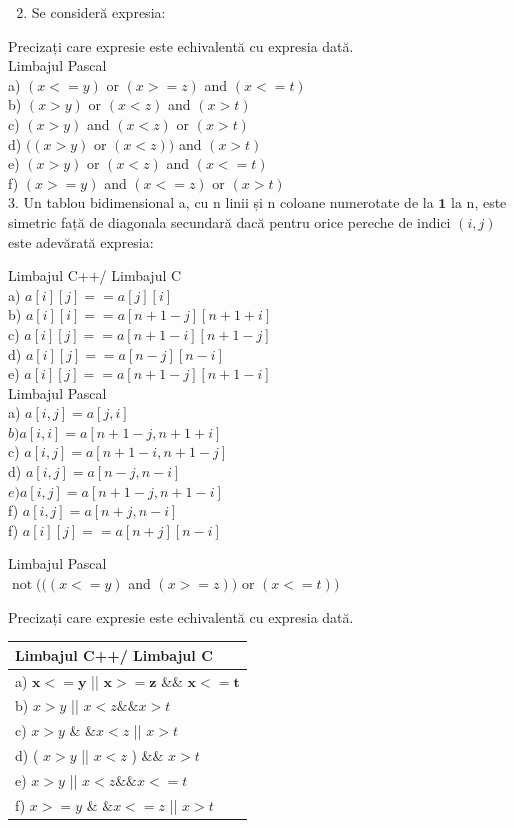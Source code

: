 \documentclass[10pt]{article}
\begin{document}
\begin{enumerate}
  \setcounter{enumi}{1}
  \item Se consideră expresia:
\end{enumerate}

Precizați care expresie este echivalentă cu expresia dată.\\
Limbajul Pascal\\
a) $(x<=y)$ or $(x>=z)$ and $(x<=t)$\\
b) $(x>y)$ or $(x<z)$ and $(x>t)$\\
c) $(x>y)$ and $(x<z)$ or $(x>t)$\\
d) $((x>y)$ or $(x<z))$ and $(x>t)$\\
e) $(x>y)$ or $(x<z)$ and $(x<=t)$\\
f) $(x>=y)$ and $(x<=z)$ or $(x>t)$\\
3. Un tablou bidimensional a, cu n linii și n coloane numerotate de la $\mathbf{1}$ la n, este simetric față de diagonala secundară dacă pentru orice pereche de indici $(i, j)$ este adevărată expresia:

Limbajul C++/ Limbajul C\\
a) $a[i][j]==a[j][i]$\\
b) $a[i][i]==a[n+1-j][n+1+i]$\\
c) $a[i][j]==a[n+1-i][n+1-j]$\\
d) $a[i][j]==a[n-j][n-i]$\\
e) $a[i][j]==a[n+1-j][n+1-i]$\\
Limbajul Pascal\\
a) $a[i, j]=a[j, i]$\\
$b) a[i, i]=a[n+1-j, n+1+i]$\\
c) $a[i, j]=a[n+1-i, n+1-j]$\\
d) $a[i, j]=a[n-j, n-i]$\\
$e) a[i, j]=a[n+1-j, n+1-i]$\\
f) $a[i, j]=a[n+j, n-i]$\\
f) $a[i][j]==a[n+j][n-i]$

Limbajul Pascal\\
$\operatorname{not}(((x<=y)$ and $(x>=z))$ or $(x<=t))$

Precizați care expresie este echivalentă cu expresia dată.

\begin{center}
\begin{tabular}{|l|}
\hline
Limbajul C++/ Limbajul C \\
\hline
a) $\mathbf{x}<=\mathbf{y}$ || $\mathbf{x}>=\mathbf{z}$ \&\& $\mathbf{x}<=\mathbf{t}$ \\
\hline
b) $x>y$ || $x<z \& \& x>t$ \\
\hline
c) $x>y$ \& $\& x<z$ || $x>t$ \\
\hline
d) ( $x>y$ || $x<z$ ) \&\& $x>t$ \\
\hline
e) $x>y$ || $x<z \& \& x<=t$ \\
\hline
f) $x>=y$ \& $\& x<=z$ || $x>t$ \\
\hline
\end{tabular}
\end{center}
\end{document}
